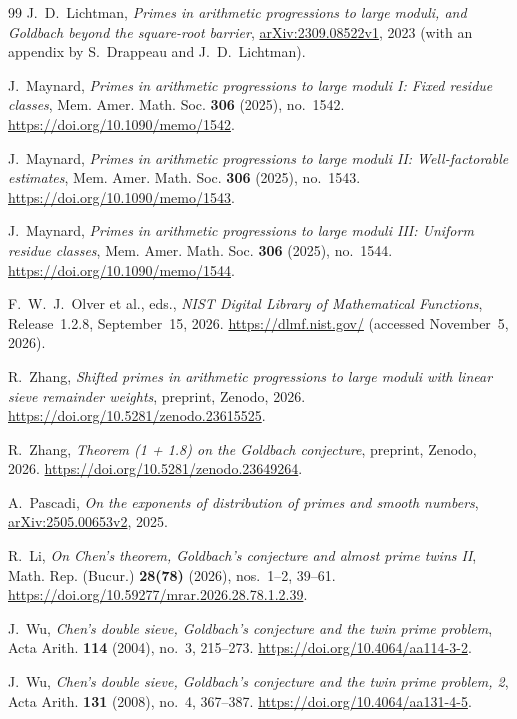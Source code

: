 \begin{thebibliography}{99}
J.~D.~Lichtman, \emph{Primes in arithmetic progressions to large moduli,
and Goldbach beyond the square-root barrier},
\href{https://arxiv.org/abs/2309.08522v1}{arXiv:2309.08522v1}, 2023
(with an appendix by S.~Drappeau and J.~D.~Lichtman).

J.~Maynard, \emph{Primes in arithmetic progressions to large moduli I:
Fixed residue classes}, Mem. Amer. Math. Soc. \textbf{306} (2025),
no.~1542.
\url{https://doi.org/10.1090/memo/1542}.

J.~Maynard, \emph{Primes in arithmetic progressions to large moduli II:
Well-factorable estimates}, Mem. Amer. Math. Soc. \textbf{306} (2025),
no.~1543.
\url{https://doi.org/10.1090/memo/1543}.

J.~Maynard, \emph{Primes in arithmetic progressions to large moduli III:
Uniform residue classes}, Mem. Amer. Math. Soc. \textbf{306} (2025),
no.~1544.
\url{https://doi.org/10.1090/memo/1544}.

F.~W.~J.~Olver et al., eds., \emph{NIST Digital Library of Mathematical
Functions}, Release~1.2.8, September~15, 2026.
\url{https://dlmf.nist.gov/} (accessed November~5, 2026).

R.~Zhang, \emph{Shifted primes in arithmetic progressions to large moduli
with linear sieve remainder weights}, preprint, Zenodo, 2026.
\url{https://doi.org/10.5281/zenodo.23615525}.

R.~Zhang, \emph{Theorem (1 + 1.8) on the Goldbach conjecture}, preprint,
Zenodo, 2026.
\url{https://doi.org/10.5281/zenodo.23649264}.

A.~Pascadi, \emph{On the exponents of distribution of primes and smooth
numbers}, \href{https://arxiv.org/abs/2505.00653v2}{arXiv:2505.00653v2},
2025.

R.~Li, \emph{On Chen's theorem, Goldbach's conjecture and almost prime
twins II}, Math. Rep. (Bucur.) \textbf{28(78)} (2026), nos.~1--2, 39--61.
\url{https://doi.org/10.59277/mrar.2026.28.78.1.2.39}.

J.~Wu, \emph{Chen's double sieve, Goldbach's conjecture and the twin prime
problem}, Acta Arith. \textbf{114} (2004), no.~3, 215--273.
\url{https://doi.org/10.4064/aa114-3-2}.

J.~Wu, \emph{Chen's double sieve, Goldbach's conjecture and the twin prime
problem, 2}, Acta Arith. \textbf{131} (2008), no.~4, 367--387.
\url{https://doi.org/10.4064/aa131-4-5}.

\end{thebibliography}
